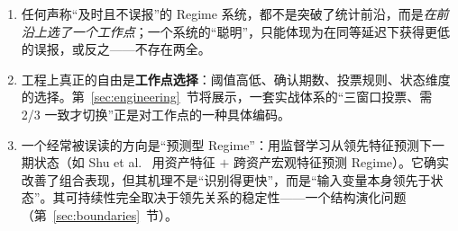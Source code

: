 \begin{enumerate}[itemsep=3pt]
\item 任何声称“及时且不误报”的 Regime 系统，都不是突破了统计前沿，而是\emph{在前沿上选了一个工作点}；一个系统的“聪明”，只能体现为在同等延迟下获得更低的误报，或反之——不存在两全。
\item 工程上真正的自由是\textbf{工作点选择}：阈值高低、确认期数、投票规则、状态维度的选择。第~\ref{sec:engineering}~节将展示，一套实战体系的“三窗口投票、需 2/3 一致才切换”正是对工作点的一种具体编码。
\item 一个经常被误读的方向是“预测型 Regime”：用监督学习从领先特征预测下一期状态（如 Shu et al.~\cite{shu2024b} 用资产特征 $+$ 跨资产宏观特征预测 Regime）。它确实改善了组合表现，但其机理不是“识别得更快”，而是“输入变量本身领先于状态”。其可持续性完全取决于领先关系的稳定性——一个结构演化问题（第~\ref{sec:boundaries}~节）。
\end{enumerate}

